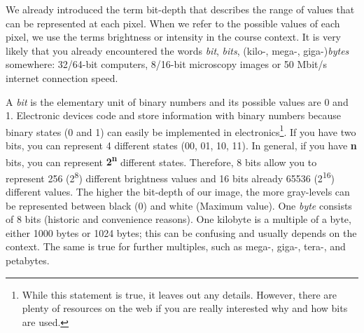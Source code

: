 We already introduced the term bit-depth that describes the range of values that can be represented at each pixel. When we refer to the possible values of each pixel, we use the terms brightness or intensity in the course context. It is very likely that you already encountered the words \emph{bit}, \emph{bits}, (kilo-, mega-, giga-)\emph{bytes} somewhere: 32/64-bit computers, 8/16-bit microscopy images or 50 Mbit/s internet connection speed.

A \emph{bit} is the elementary unit of binary numbers and its possible values are 0 and 1. Electronic devices code and store information with binary numbers because binary states (0 and 1) can easily be implemented in electronics\footnote{While this statement is true, it leaves out any details. However, there are plenty of resources on the web if you are really interested why and how bits are used.}. If you have two bits, you can represent 4 different states (00, 01, 10, 11). In general, if you have \textbf{n} bits, you can represent \textbf{2\textsuperscript{n}} different states. Therefore, 8 bits allow you to represent 256 (2\textsuperscript{8}) different brightness values and 16 bits already 65536 (2\textsuperscript{16}) different values. The higher the bit-depth of our image, the more gray-levels can be represented between black (0) and white (Maximum value). One \emph{byte} consists of 8 bits (historic and convenience reasons). One kilobyte is a multiple of a byte, either 1000 bytes or 1024 bytes; this can be confusing and usually depends on the context. The same is true for further multiples, such as mega-, giga-, tera-, and petabytes.

